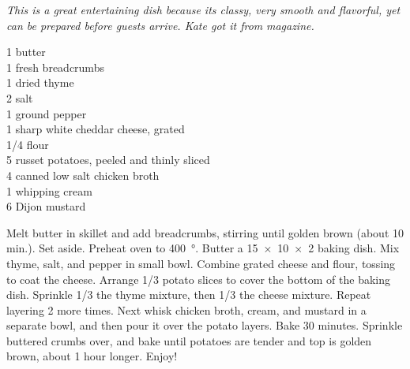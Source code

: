 \textit{This is a great entertaining dish because its classy, very smooth and
  flavorful, yet can be prepared before guests arrive. Kate got it from}
 \textit{magazine.}
\begin{ingredients}
  \SI{1}{\tblspoon} butter\\
  \SI{1}{\cup} fresh breadcrumbs\\
  \SI{1}{\tblspoon} dried thyme\\
  \SI{2}{\teaspoon} salt\\
  \SI{1}{\teaspoon} ground pepper\\
  \SI{1}{\pound} sharp white cheddar cheese, grated\\
  \SI{1/4}{\cup} flour\\
  \SI{5}{\pound} russet potatoes, peeled and thinly sliced\\
  \SI{4}{\cup} canned low salt chicken broth\\
  \SI{1}{\cup} whipping cream\\
  \SI{6}{\tblspoon} Dijon mustard
\end{ingredients}
Melt butter in skillet and add breadcrumbs, stirring until golden brown (about
10 min.). Set aside. Preheat oven to \SI{400}{\degree}. Butter a
\SI{15x10x2}{\inch} baking dish. Mix thyme, salt, and pepper in small
bowl. Combine grated cheese and flour, tossing to coat the cheese. Arrange
\num{1/3} potato slices to cover the bottom of the baking dish. Sprinkle
\num{1/3} the thyme mixture, then \num{1/3} the cheese mixture. Repeat
layering 2 more times.  Next whisk chicken broth, cream, and mustard in a
separate bowl, and then pour it over the potato layers. Bake 30
minutes. Sprinkle buttered crumbs over, and bake until potatoes are tender and
top is golden brown, about 1 hour longer.  Enjoy!
